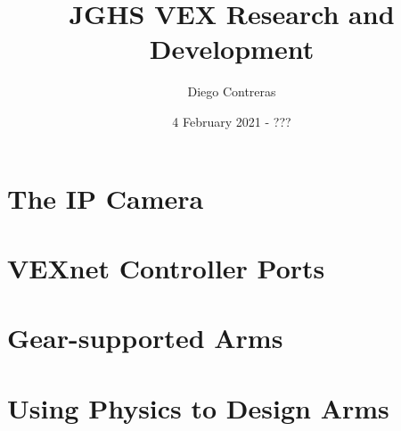 \documentclass[12pt]{article}
\title{JGHS VEX Research and Development}
\author{Diego Contreras}
\date{4 February 2021 - ???}
\begin{document}
\maketitle
\newpage
\tableofcontents



\newpage
\section{The IP Camera}







\section{VEXnet Controller Ports}
\section{Gear-supported Arms}
\section{Using Physics to Design Arms}



\end{document}
